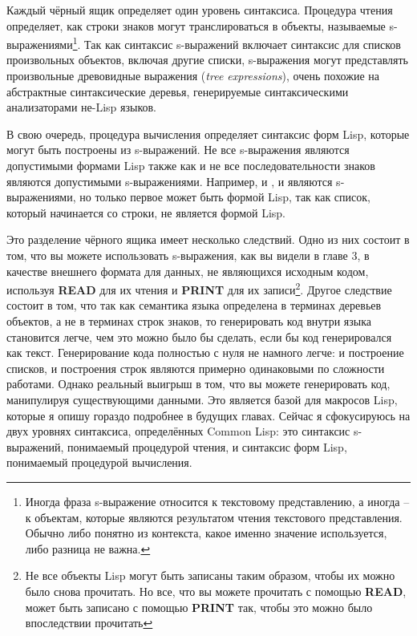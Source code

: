 Каждый чёрный ящик определяет один уровень синтаксиса. Процедура чтения определяет, как
строки знаков могут транслироваться в объекты, называемые s-выражениями\footnote{Иногда
  фраза s-выражение относится к текстовому представлению, а иногда -- к объектам, которые
  являются результатом чтения текстового представления. Обычно либо понятно из контекста,
  какое именно значение используется, либо разница не важна.}. Так как синтаксис
s-выражений включает синтаксис для списков произвольных объектов, включая другие списки,
s-выражения могут представлять произвольные древовидные выражения (\textit{tree
  expressions}), очень похожие на абстрактные синтаксические деревья, генерируемые
синтаксическими анализаторами не-Lisp языков.

В свою очередь, процедура вычисления определяет синтаксис форм Lisp, которые могут быть
построены из s-выражений. Не все s-выражения являются допустимыми формами Lisp также как и
не все последовательности знаков являются допустимыми s-выражениями. Например, и
, и  являются s-выражениями, но только первое может быть
формой Lisp, так как список, который начинается со строки, не является формой Lisp.

Это разделение чёрного ящика имеет несколько следствий. Одно из них состоит в том, что вы
можете использовать s-выражения, как вы видели в главе 3, в качестве внешнего формата для
данных, не являющихся исходным кодом, используя \textbf{READ} для их чтения и
\textbf{PRINT} для их записи\footnote{Не все объекты Lisp могут быть записаны таким
  образом, чтобы их можно было снова прочитать. Но все, что вы можете прочитать с помощью
  \textbf{READ}, может быть записано с помощью \textbf{PRINT} так, чтобы это можно было
  впоследствии прочитать}. Другое следствие состоит в том, что так как семантика языка
определена в терминах деревьев объектов, а не в терминах строк знаков, то генерировать код
внутри языка становится легче, чем это можно было бы сделать, если бы код генерировался
как текст. Генерирование кода полностью с нуля не намного легче: и построение списков, и
построения строк являются примерно одинаковыми по сложности работами. Однако реальный
выигрыш в том, что вы можете генерировать код, манипулируя существующими данными. Это
является базой для макросов Lisp, которые я опишу гораздо подробнее в будущих
главах. Сейчас я сфокусируюсь на двух уровнях синтаксиса, определённых Common Lisp: это
синтаксис s-выражений, понимаемый процедурой чтения, и синтаксис форм Lisp, понимаемый
процедурой вычисления.

